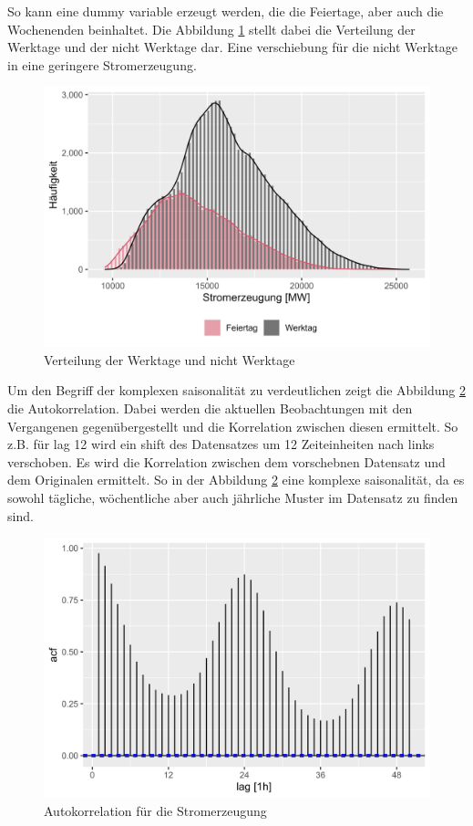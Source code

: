 \documentclass[11pt,ngerman,a4paper,]{article}
\begin{document}
So kann eine dummy variable erzeugt werden, die die Feiertage, aber auch die Wochenenden beinhaltet. Die Abbildung \ref{fig:workday_histogram} stellt dabei die Verteilung der Werktage und der nicht Werktage dar. Eine verschiebung für die nicht Werktage in eine geringere Stromerzeugung.

\begin{figure}[H]
\centering
\includegraphics[width=1.0\textwidth]{plots/workday_histogram}
\caption{Verteilung der Werktage und nicht Werktage}
\label{fig:workday_histogram}
\end{figure}

Um den Begriff der komplexen saisonalität zu verdeutlichen zeigt die Abbildung \ref{fig:acf} die Autokorrelation. Dabei werden die aktuellen Beobachtungen mit den Vergangenen gegenübergestellt und die Korrelation zwischen diesen ermittelt. So z.B. für lag 12 wird ein shift des Datensatzes um 12 Zeiteinheiten nach links verschoben. Es wird die Korrelation zwischen dem vorschebnen Datensatz und dem Originalen ermittelt. So in der Abbildung \ref{fig:acf} eine komplexe saisonalität, da es sowohl tägliche, wöchentliche aber auch jährliche Muster im Datensatz zu finden sind.

\begin{figure}[H]
\centering
\includegraphics[width=1.0\textwidth]{plots/autocorrelation}
\caption{Autokorrelation für die Stromerzeugung}
\label{fig:acf}
\end{figure}
\end{document}
